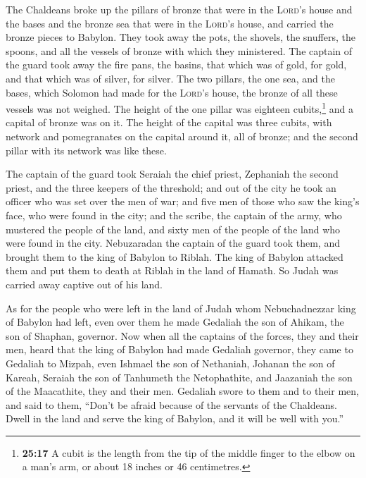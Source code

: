  The Chaldeans broke up the pillars of bronze that were
in the \textsc{Lord}'s house and the bases and the bronze sea that were
in the \textsc{Lord}'s house, and carried the bronze pieces to Babylon.
 They took away the pots, the shovels, the snuffers, the
spoons, and all the vessels of bronze with which they ministered.
 The captain of the guard took away the fire pans, the
basins, that which was of gold, for gold, and that which was of silver,
for silver.  The two pillars, the one sea, and the bases,
which Solomon had made for the \textsc{Lord}'s house, the bronze of all
these vessels was not weighed.  The height of the one
pillar was eighteen cubits,\footnote{\textbf{25:17} A cubit is the
  length from the tip of the middle finger to the elbow on a man's arm,
  or about 18 inches or 46 centimetres.} and a capital of bronze was on
it. The height of the capital was three cubits, with network and
pomegranates on the capital around it, all of bronze; and the second
pillar with its network was like these.

 The captain of the guard took Seraiah the chief priest,
Zephaniah the second priest, and the three keepers of the threshold;
 and out of the city he took an officer who was set over
the men of war; and five men of those who saw the king's face, who were
found in the city; and the scribe, the captain of the army, who mustered
the people of the land, and sixty men of the people of the land who were
found in the city.  Nebuzaradan the captain of the guard
took them, and brought them to the king of Babylon to Riblah.
 The king of Babylon attacked them and put them to death
at Riblah in the land of Hamath. So Judah was carried away captive out
of his land.

 As for the people who were left in the land of Judah
whom Nebuchadnezzar king of Babylon had left, even over them he made
Gedaliah the son of Ahikam, the son of Shaphan, governor.
 Now when all the captains of the forces, they and their
men, heard that the king of Babylon had made Gedaliah governor, they
came to Gedaliah to Mizpah, even Ishmael the son of Nethaniah, Johanan
the son of Kareah, Seraiah the son of Tanhumeth the Netophathite, and
Jaazaniah the son of the Maacathite, they and their men. 
Gedaliah swore to them and to their men, and said to them, ``Don't be
afraid because of the servants of the Chaldeans. Dwell in the land and
serve the king of Babylon, and it will be well with you.''

